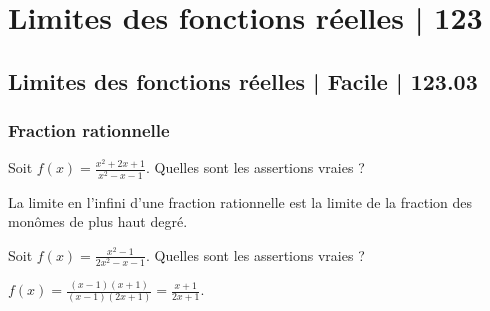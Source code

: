 

\section{Limites des fonctions réelles | 123}





\subsection{Limites des fonctions réelles | Facile | 123.03}


\subsubsection{Fraction rationnelle}
 
\begin{question} 
Soit $f(x)= \frac{x^2+2x+1}{x^2-x-1}$. Quelles sont les assertions vraies ?
\begin{answers}



\end{answers}
\begin{explanations}
La limite en l'infini d'une fraction rationnelle est la limite de la fraction des monômes de plus haut degré.

  
\end{explanations}

\end{question}


\begin{question} 
Soit $f(x)= \frac{x^2-1}{2x^2-x-1}$. Quelles sont les assertions vraies ?
\begin{answers}



\end{answers}
\begin{explanations}
$f(x)=\frac{(x-1)(x+1)}{(x-1)(2x+1)}= \frac{x+1}{2x+1}$.
\end{explanations}

\end{question}


